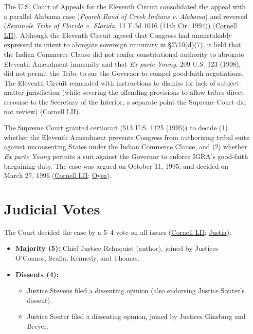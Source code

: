 \documentclass[12pt]{article}
\begin{document}
The U.S. Court of Appeals for the Eleventh Circuit consolidated the appeal with a parallel Alabama case (\textit{Poarch Band of Creek Indians v. Alabama}) and reversed (\textit{Seminole Tribe of Florida v. Florida}, 11 F.3d 1016 (11th Cir. 1994)) (\href{https://www.law.cornell.edu/supct/html/94-12.ZO.html}{Cornell LII}). Although the Eleventh Circuit agreed that Congress had unmistakably expressed its intent to abrogate sovereign immunity in \S 2710(d)(7), it held that the Indian Commerce Clause did not confer constitutional authority to abrogate Eleventh Amendment immunity and that \textit{Ex parte Young}, 209 U.S. 123 (1908), did not permit the Tribe to sue the Governor to compel good-faith negotiations. The Eleventh Circuit remanded with instructions to dismiss for lack of subject-matter jurisdiction (while severing the offending provisions to allow tribes direct recourse to the Secretary of the Interior, a separate point the Supreme Court did not review) (\href{https://www.law.cornell.edu/supct/html/94-12.ZO.html}{Cornell LII}).

The Supreme Court granted certiorari (513 U.S. 1125 (1995)) to decide (1) whether the Eleventh Amendment prevents Congress from authorizing tribal suits against unconsenting States under the Indian Commerce Clause, and (2) whether \textit{Ex parte Young} permits a suit against the Governor to enforce IGRA's good-faith bargaining duty. The case was argued on October 11, 1995, and decided on March 27, 1996 (\href{https://www.law.cornell.edu/supct/html/94-12.ZO.html}{Cornell LII}; \href{https://www.oyez.org/cases/1995/94-12}{Oyez}).

\section{Judicial Votes}

The Court decided the case by a 5--4 vote on all issues (\href{https://www.law.cornell.edu/supct/html/94-12.ZO.html}{Cornell LII}; \href{https://supreme.justia.com/cases/federal/us/517/44/}{Justia}):

\begin{itemize}
\item \textbf{Majority (5):} Chief Justice Rehnquist (author), joined by Justices O'Connor, Scalia, Kennedy, and Thomas.
\item \textbf{Dissents (4):}
\begin{itemize}
\item Justice Stevens filed a dissenting opinion (also endorsing Justice Souter's dissent).
\item Justice Souter filed a dissenting opinion, joined by Justices Ginsburg and Breyer.
\end{itemize}
\end{itemize}
\end{document}
